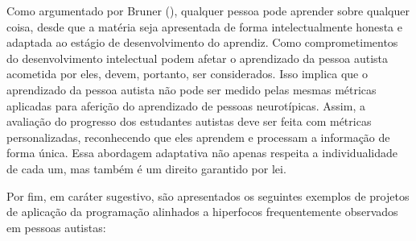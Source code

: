\documentclass[
  12pt,
  a4paper,
]{article}
\begin{document}
Como argumentado por Bruner (),
qualquer pessoa pode aprender sobre qualquer coisa, desde que a matéria
seja apresentada de forma intelectualmente honesta e adaptada ao estágio
de desenvolvimento do aprendiz. Como comprometimentos do desenvolvimento
intelectual podem afetar o aprendizado da pessoa autista acometida por
eles, devem, portanto, ser considerados. Isso implica que o aprendizado
da pessoa autista não pode ser medido pelas mesmas métricas aplicadas
para aferição do aprendizado de pessoas neurotípicas. Assim, a avaliação
do progresso dos estudantes autistas deve ser feita com métricas
personalizadas, reconhecendo que eles aprendem e processam a informação
de forma única. Essa abordagem adaptativa não apenas respeita a
individualidade de cada um, mas também é um direito garantido por lei.

Por fim, em caráter sugestivo, são apresentados os seguintes exemplos de
projetos de aplicação da programação alinhados a hiperfocos
frequentemente observados em pessoas autistas:
\end{document}
